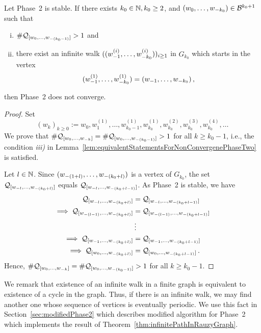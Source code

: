 \begin{thm}
\label{thm:infinitePathInRauzyGraph}
Let Phase~2 is stable.  If there exists $k_0\in\NN, k_0\geq 2$, and $\tupleo{k_0}\in\B^{k_0+1}$ such that
\begin{enumerate}[i)]
	\item $\#\Qwo{(k_0-1)}>1$ and
	\item there exist an infinite walk $(\tuple[w^{(i)}]{1}{k_0})_{i\geq 1}$ in $G_{k_0}$ which starts in the vertex  $$\tuple[w^{(1)}]{1}{k_0}=\tuple{1}{k_0}\,,$$ 
\end{enumerate}
then Phase~2 does not converge.
\end{thm}
\begin{proof}
Set
$$(w_k)_{k\geq 0}:=w_0, w_1^{(1)}, \dots , w^{(1)}_{k_0-1}, w^{(1)}_{k_0}, w_{k_0}^{(2)},w_{k_0}^{(3)},w_{k_0}^{(4)},\dots$$
We prove that $\#\Qwo{k}=\#\Qwo{(k_0-1)}>1$ for all $k\geq k_0-1$, i.e., the condition \textit{iii)} in Lemma~\ref{lem:equivalentStatementsForNonConvergenePhaseTwo} is satisfied.


Let $l\in\NN$. Since $\tuple{(1+l)}{(k_0+l)}$ is a vertex of $G_{k_0}$, the set $\Qw{l}{(k_0+l)}$ equals $\Qw{l}{(k_0+l-1)}$. As Phase~2 is stable, we have
\begin{align*}
\Qw{l}{(k_0+l)}&=\Qw{l}{(k_0+l-1)}\\
\implies \Qw{(l-1)}{(k_0+l)}&=\Qw{(l-1)}{(k_0+l-1)}\\
&\vdots \\
\implies \Qw{1}{(k_0+l)}&=\Qw{1}{(k_0+l-1)}\\
\implies \Qwo{(k_0+l)}&=\Qwo{(k_0+l-1)}\,.
\end{align*}
Hence, $\#\Qwo{k}=\#\Qwo{(k_0-1)}>1$ for all $k\geq k_0-1$.
\end{proof}



We remark that existence of an infinite walk in a finite graph is equivalent to existence of a cycle in the graph. Thus, if there is an infinite walk, we may find another one whose sequence of vertices is eventually periodic. We use this fact in Section~\ref{sec:modifiedPhase2} which describes modified algorithm for Phase~2 which implements the result of Theorem~\ref{thm:infinitePathInRauzyGraph}.









